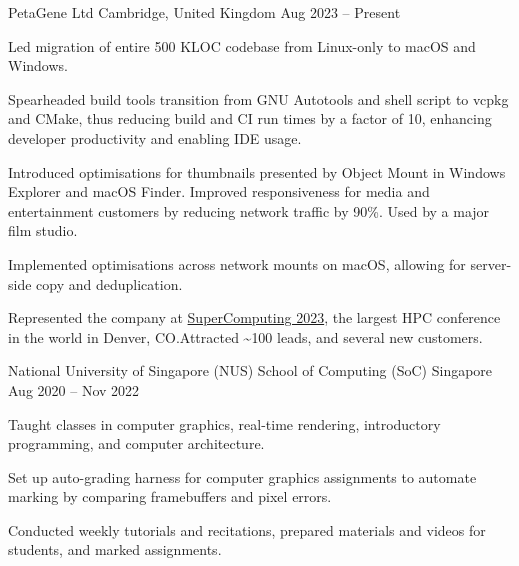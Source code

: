 \begin{cventries}
	{PetaGene Ltd} %
	{Cambridge, United Kingdom} %
	{Aug 2023 -- Present} %
	{
		\vspace{4.5mm}
		\begin{cvitems} %
			\item Led migration of entire 500 KLOC codebase from Linux-only to macOS and Windows.
			\item Spearheaded build tools transition from GNU Autotools and shell script to vcpkg and CMake, thus reducing build and CI run times by a factor of 10, enhancing developer productivity and enabling IDE usage.
			\item Introduced optimisations for thumbnails presented by Object Mount in Windows Explorer and macOS Finder. Improved responsiveness for media and entertainment customers by reducing network traffic by 90\%. Used by a major film studio.
			\item Implemented optimisations across network mounts on macOS, allowing for server-side copy and deduplication.
			\item Represented the company at \href{https://hallerickson.ungerboeck.com/prod/app85.cshtml?aat=5663535078317a434974474478437845326c2b766b2b4c562b355033396d433556704e2b3065744c5161773d&ExhibitorID=7040}{SuperComputing 2023}, the largest HPC conference in the world in Denver, CO.\@ Attracted \textasciitilde100 leads, and several new customers.
		\end{cvitems}
	}


	{National University of Singapore (NUS) School of Computing (SoC)} %
	{Singapore} %
	{Aug 2020 -- Nov 2022} %
	{
		\begin{cvitems} %
			\item Taught classes in computer graphics, real-time rendering, introductory programming, and computer architecture.
			\item Set up auto-grading harness for computer graphics assignments to automate marking by comparing framebuffers and pixel errors.
			\item Conducted weekly tutorials and recitations, prepared materials and videos for students, and marked assignments.
		\end{cvitems}
	}


\end{cventries}

